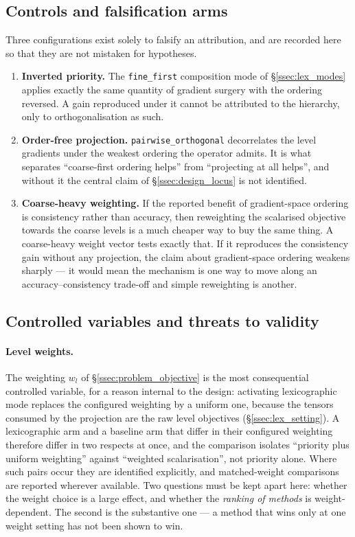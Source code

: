\subsection{Controls and falsification arms}
\label{ssec:design_controls}

Three configurations exist solely to falsify an attribution, and are recorded here
so that they are not mistaken for hypotheses.

\begin{enumerate}
    \item \textbf{Inverted priority.} The \texttt{fine\_first} composition mode of
    \S\ref{ssec:lex_modes} applies exactly the same quantity of gradient surgery
    with the ordering reversed. A gain reproduced under it cannot be attributed to
    the hierarchy, only to orthogonalisation as such.
    \item \textbf{Order-free projection.} \texttt{pairwise\_orthogonal}
    decorrelates the level gradients under the weakest ordering the operator
    admits. It is what separates ``coarse-first ordering helps'' from ``projecting
    at all helps'', and without it the central claim of
    \S\ref{ssec:design_locus} is not identified.
    \item \textbf{Coarse-heavy weighting.} If the reported benefit of
    gradient-space ordering is consistency rather than accuracy, then reweighting
    the scalarised objective towards the coarse levels is a much cheaper way to buy
    the same thing. A coarse-heavy weight vector tests exactly that. If it
    reproduces the consistency gain without any projection, the claim about
    gradient-space ordering weakens sharply --- it would mean the mechanism is one
    way to move along an accuracy--consistency trade-off and simple reweighting is
    another.
\end{enumerate}

\subsection{Controlled variables and threats to validity}
\label{ssec:design_threats}

\paragraph{Level weights.} The weighting $w_l$ of \S\ref{ssec:problem_objective}
is the most consequential controlled variable, for a reason internal to the
design: activating lexicographic mode replaces the configured weighting by a
uniform one, because the tensors consumed by the projection are the raw level
objectives (\S\ref{ssec:lex_setting}). A lexicographic arm and a baseline arm that
differ in their configured weighting therefore differ in two respects at once, and
the comparison isolates ``priority plus uniform weighting'' against ``weighted
scalarisation'', not priority alone. Where such pairs occur they are identified
explicitly, and matched-weight comparisons are reported wherever available. Two
questions must be kept apart here: whether the weight choice is a large effect,
and whether the \emph{ranking of methods} is weight-dependent. The second is the
substantive one --- a method that wins only at one weight setting has not been
shown to win.

